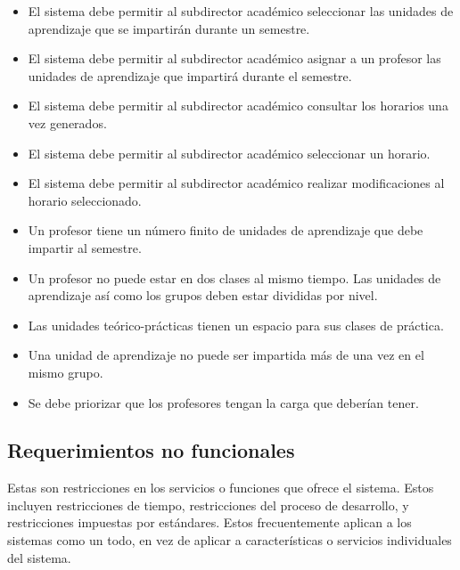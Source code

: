 	\begin{itemize}
		\item El sistema debe permitir al subdirector académico seleccionar las unidades de aprendizaje que se impartirán durante un semestre.
		
		\item El sistema debe permitir al subdirector académico asignar a un profesor las unidades de aprendizaje que impartirá durante el semestre.
		
		\item El sistema debe permitir al subdirector académico consultar los horarios una vez generados.
		
		\item El sistema debe permitir al subdirector académico seleccionar un horario.
		
		\item El sistema debe permitir al subdirector académico realizar modificaciones al horario seleccionado.
		
		\item Un profesor tiene un número finito de unidades de aprendizaje que debe impartir al semestre.
		
		\item Un profesor no puede estar en dos clases al mismo tiempo.
		Las unidades de aprendizaje así como los grupos deben estar divididas por nivel.
		
		\item Las unidades teórico-prácticas tienen un espacio para sus clases de práctica.
		
		\item Una unidad de aprendizaje no puede ser impartida más de una vez en el mismo grupo.
		
		\item Se debe priorizar que los profesores tengan la carga que deberían tener.
		
	\end{itemize}
	

\subsection{Requerimientos no funcionales}
	
	Estas son restricciones en los servicios o funciones que ofrece el sistema. Estos incluyen restricciones de tiempo, restricciones del proceso de desarrollo, y restricciones impuestas por estándares. Estos frecuentemente aplican a los sistemas como un todo, en vez de aplicar a características o servicios individuales del sistema. \\
	
